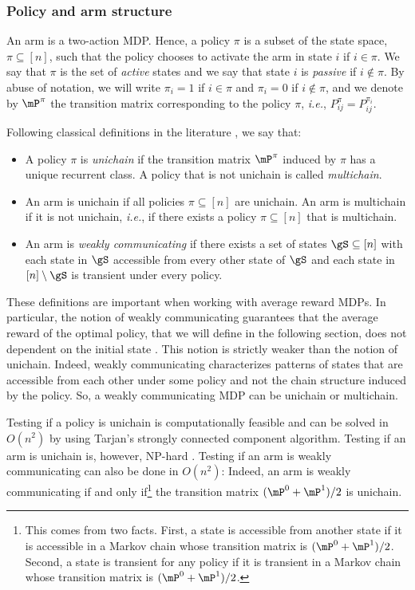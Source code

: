 \subsubsection{Policy and arm structure}

An arm is a two-action MDP. Hence, a policy $\pi$ is a subset of the state space, $\pi\subseteq[n]$, such that the policy chooses to activate the arm in state $i$ if $i\in\pi$. We say that $\pi$ is the set of \emph{active} states and we say that state $i$ is \emph{passive} if $i\not\in\pi$. By abuse of notation, we will write $\pi_i=1$ if $i\in\pi$ and $\pi_i=0$ if $i\not\in\pi$, and we denote by $\mP^\pi$ the transition matrix corresponding to the policy $\pi$, \emph{i.e.}, $P^\pi_{ij}=P^{\pi_i}_{ij}$.

Following classical definitions in the literature \cite{puterman2014markov}, we say that:
\begin{itemize}
    \item A policy $\pi$ is \emph{unichain} if the transition matrix $\mP^\pi$ induced by $\pi$ has a unique recurrent class. A policy that is not unichain is called \emph{multichain}.
    \item An arm is unichain if all policies $\pi\subseteq[n]$ are unichain. An arm is multichain if it is not unichain, \emph{i.e.}, if there exists a policy $\pi\subseteq[n]$ that is multichain.
    \item An arm is \emph{weakly communicating} if there exists a set of states $\gS\subseteq[n]$ with each state in $\gS$ accessible from every other state of $\gS$ and each state in $[n]\setminus\gS$ is transient under every policy.
\end{itemize}
These definitions are important when working with average reward MDPs. In particular, the notion of weakly communicating guarantees that the average reward of the optimal policy, that we will define in the following section, does not dependent on the initial state \cite{puterman2014markov}. This notion is strictly weaker than the notion of unichain. 
Indeed, weakly communicating characterizes patterns of states that are accessible from each other under some policy and not the chain structure induced by the policy.
So, a weakly communicating MDP can be unichain or multichain.

Testing if a policy is unichain is computationally feasible and can be solved in $O(n^2)$ by using Tarjan's strongly connected component algorithm. Testing if an arm is unichain is, however, NP-hard \cite{tsitsiklis2007np}. Testing if an arm is weakly communicating can also be done in $O(n^2)$: Indeed, an arm is weakly communicating if and only if\footnote{This comes from two facts. First, a state is accessible from another state if it is accessible in a Markov chain whose transition matrix is $(\mP^0 +\mP^1)/2$. Second, a state is transient for any policy if it is transient in a Markov chain whose transition matrix is $(\mP^0 +\mP^1)/2$.} the transition matrix $(\mP^0 +\mP^1)/2$ is unichain.

